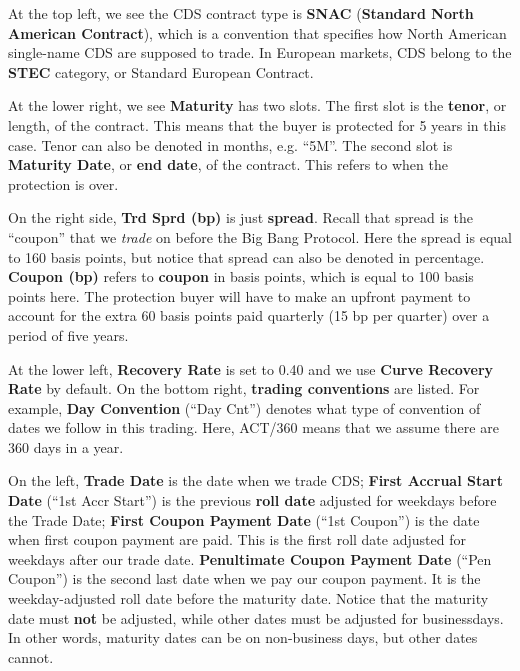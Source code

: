 \documentclass{jss}
\begin{document}
At the top left, we see the CDS contract type is \textbf{SNAC} (\textbf{Standard North American Contract}), which is a convention that specifies how North American single-name CDS are supposed to trade. In European markets, CDS belong to the \textbf{STEC} category, or Standard European Contract.

At the lower right, we see \textbf{Maturity} has two slots. The first slot is the \textbf{tenor}, or length, of the contract. This means that the buyer is protected for 5 years in this case. Tenor can also be denoted in months, e.g. ``5M''. The second slot is \textbf{Maturity Date}, or \textbf{end date}, of the contract. This refers to when the protection is over. 

On the right side, \textbf{Trd Sprd (bp)} is just \textbf{spread}. Recall that spread is the ``coupon'' that we \textit{trade} on before the Big Bang Protocol. Here the spread is equal to 160 basis points, but notice that spread can also be denoted in percentage. \textbf{Coupon (bp)} refers to \textbf{coupon} in basis points, which is equal to 100 basis points here. The protection buyer will have to make an upfront payment to account for the extra 60 basis points paid quarterly (15 bp per quarter) over a period of five years.

At the lower left, \textbf{Recovery Rate} is set to 0.40 and we use \textbf{Curve Recovery Rate} by default. On the bottom right, \textbf{trading conventions} are listed. For example, \textbf{Day Convention} (``Day Cnt'') denotes what type of convention of dates we follow in this trading. Here, ACT/360 means that we assume there are 360 days in a year. 

On the left, \textbf{Trade Date} is the date when we trade CDS; \textbf{First Accrual Start Date} (``1st Accr Start'') is the previous \textbf{roll date} adjusted for weekdays before the Trade Date; \textbf{First Coupon Payment Date} (``1st Coupon'') is the date when first coupon payment are paid. This is the first roll date adjusted for weekdays after our trade date. \textbf{Penultimate Coupon Payment Date} (``Pen Coupon'') is the second last date when we pay our coupon payment. It is the weekday-adjusted roll date before the maturity date. Notice that the maturity date must \textbf{not} be adjusted, while other dates must be adjusted for businessdays. In other words, maturity dates can be on non-business days, but other dates cannot.

\newpage
\end{document}
